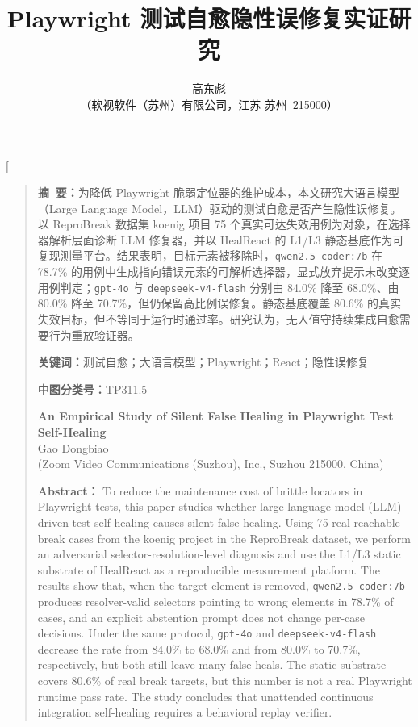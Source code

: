 \documentclass[UTF8, a4paper, 10.5pt, twocolumn, fontset=none]{ctexart}
\title{Playwright 测试自愈隐性误修复实证研究}
\author{
  高东彪\\
  \small（软视软件（苏州）有限公司，江苏 苏州 \,215000）
}
\date{}
\begin{document}
\twocolumn[
  \begin{@twocolumnfalse}
  \maketitle
  \vspace{-12pt}
  \begin{quote}
  \small
  \noindent\textbf{摘\ 要：}为降低 Playwright 脆弱定位器的维护成本，本文研究大语言模型（Large Language Model，LLM）驱动的测试自愈是否产生隐性误修复。以 ReproBreak 数据集 koenig 项目 75 个真实可达失效用例为对象，在选择器解析层面诊断 LLM 修复器，并以 HealReact 的 L1/L3 静态基底作为可复现测量平台。结果表明，目标元素被移除时，\texttt{qwen2.5-coder:7b} 在 78.7\% 的用例中生成指向错误元素的可解析选择器，显式放弃提示未改变逐用例判定；\texttt{gpt-4o} 与 \texttt{deepseek-v4-flash} 分别由 84.0\% 降至 68.0\%、由 80.0\% 降至 70.7\%，但仍保留高比例误修复。静态基底覆盖 80.6\% 的真实失效目标，但不等同于运行时通过率。研究认为，无人值守持续集成自愈需要行为重放验证器。

  \vspace{2pt}
  \noindent\textbf{关键词：}测试自愈；大语言模型；Playwright；React；隐性误修复

  \vspace{2pt}
  \noindent\textbf{中图分类号：}TP311.5

  \vspace{4pt}
  \begin{center}
  \textbf{An Empirical Study of Silent False Healing in Playwright Test Self-Healing}\\
  Gao Dongbiao\\
  \small (Zoom Video Communications (Suzhou), Inc., Suzhou 215000, China)
  \end{center}

  \vspace{2pt}
  \noindent\textbf{Abstract：} To reduce the maintenance cost of brittle locators in Playwright tests, this paper studies whether large language model (LLM)-driven test self-healing causes silent false healing. Using 75 real reachable break cases from the koenig project in the ReproBreak dataset, we perform an adversarial selector-resolution-level diagnosis and use the L1/L3 static substrate of HealReact as a reproducible measurement platform. The results show that, when the target element is removed, \texttt{qwen2.5-coder:7b} produces resolver-valid selectors pointing to wrong elements in 78.7\% of cases, and an explicit abstention prompt does not change per-case decisions. Under the same protocol, \texttt{gpt-4o} and \texttt{deepseek-v4-flash} decrease the rate from 84.0\% to 68.0\% and from 80.0\% to 70.7\%, respectively, but both still leave many false heals. The static substrate covers 80.6\% of real break targets, but this number is not a real Playwright runtime pass rate. The study concludes that unattended continuous integration self-healing requires a behavioral replay verifier.


\end{quote}
\end{@twocolumnfalse}
\end{document}
